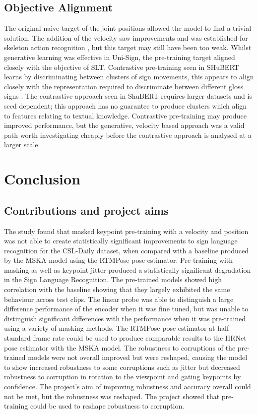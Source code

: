 \documentclass{article}
\begin{document}
\subsection{Objective Alignment}
The original naive target of the joint positions allowed the model to find a trivial solution. The addition of the velocity saw improvements and was established for skeleton action recognition \cite{shi_decoupled_2020}, but this target may still have been too weak. Whilst generative learning was effective in Uni-Sign, the pre-training target aligned closely with the objective of SLT. Contrastive pre-training seen in SHuBERT learns by discriminating between clusters of sign movements, this appears to align closely with the representation required to discriminate between different gloss signs \cite{hsu_hubert_2021} \cite{liu_self-supervised_2021}. The contrastive approach seen in ShuBERT requires larger datasets and is seed dependent; this approach has no guarantee to produce clusters which align to features relating to textual knowledge. Contrastive pre-training may produce improved performance, but the generative, velocity based approach was a valid path worth investigating cheaply before the contrastive approach is analysed at a larger scale.

\newpage

\section{Conclusion}
\subsection{Contributions and project aims}
The study found that masked keypoint pre-training with a velocity and position was not able to create statistically significant improvements to sign language recognition for the CSL-Daily dataset, when compared with a baseline produced by the MSKA model using the RTMPose pose estimator. Pre-training with masking as well as keypoint jitter produced a statistically significant degradation in the Sign Language Recognition. The pre-trained models showed high correlation with the baseline showing that they largely exhibited the same behaviour across test clips. The linear probe was able to distinguish a large difference performance of the encoder when it was fine tuned, but was unable to distinguish significant differences with the performance when it was pre-trained using a variety of masking methods. The RTMPose pose estimator at half standard frame rate could be used to produce comparable results to the HRNet pose estimator with the MSKA model. The robustness to corruptions of the pre-trained models were not overall improved but were reshaped, causing the model to show increased robustness to some corruptions such as jitter but decreased robustness to corruption in rotation to the viewpoint and gating keypoints by confidence. The project's aim of improving robustness and accuracy overall could not be met, but the robustness was reshaped. The project showed that pre-training could be used to reshape robustness to corruption.
\end{document}
